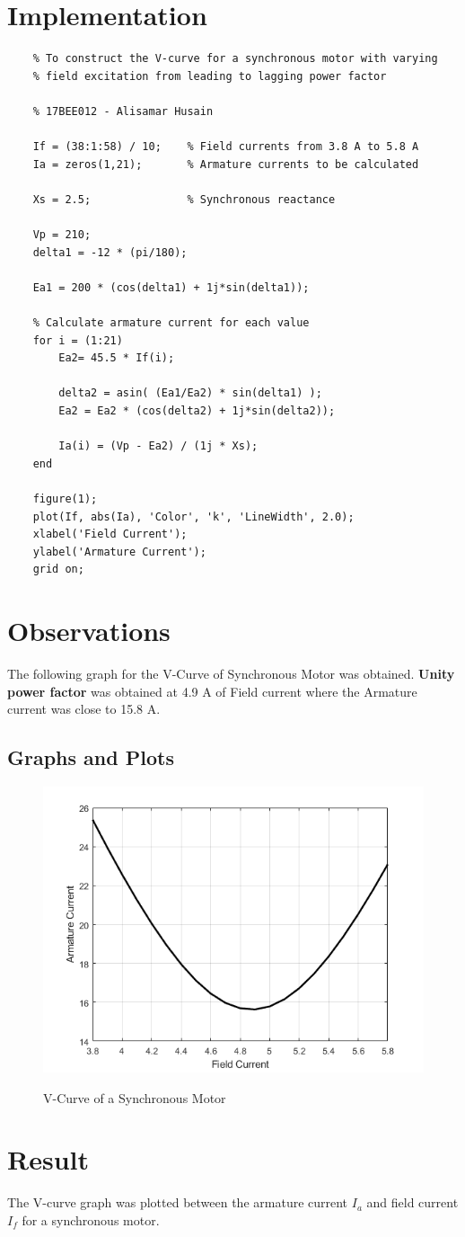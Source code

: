 \documentclass[a4paper,12pt]{article}
\begin{document}
  \section{Implementation}
  \begin{lstlisting}
    % To construct the V-curve for a synchronous motor with varying  
    % field excitation from leading to lagging power factor

    % 17BEE012 - Alisamar Husain

    If = (38:1:58) / 10;    % Field currents from 3.8 A to 5.8 A
    Ia = zeros(1,21);       % Armature currents to be calculated

    Xs = 2.5;               % Synchronous reactance

    Vp = 210;
    delta1 = -12 * (pi/180);

    Ea1 = 200 * (cos(delta1) + 1j*sin(delta1));

    % Calculate armature current for each value
    for i = (1:21)
        Ea2= 45.5 * If(i);
        
        delta2 = asin( (Ea1/Ea2) * sin(delta1) );
        Ea2 = Ea2 * (cos(delta2) + 1j*sin(delta2));
        
        Ia(i) = (Vp - Ea2) / (1j * Xs);
    end

    figure(1);
    plot(If, abs(Ia), 'Color', 'k', 'LineWidth', 2.0);
    xlabel('Field Current');
    ylabel('Armature Current');
    grid on;
  \end{lstlisting}

  \pagebreak
  \section{Observations}
  The following graph for the V-Curve of Synchronous Motor was obtained.
  {\bf Unity power factor} was obtained at 4.9 A of Field current where the Armature
  current was close to 15.8 A.
    \subsection{Graphs and Plots}
    \begin{figure}[H]
      \centering
      \includegraphics[width=5in]{img/vc2.png}
      \label{result}
      \caption{V-Curve of a Synchronous Motor}
    \end{figure}

  \section{Result}
  The V-curve graph was plotted between the armature current $I_a$ and field 
  current $I_f$ for a synchronous motor.
\end{document}
